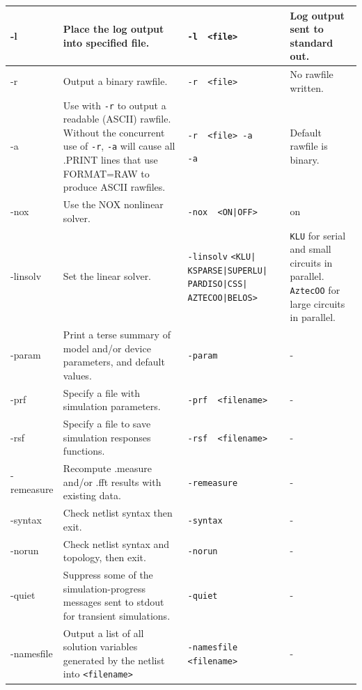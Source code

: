 \begin{longtable}[h] {>{\raggedright\small}m{1.1in}|>{\raggedright\small}m{2in}|>{\raggedright\small}m{1.5in}|>{\raggedright\let\\\tabularnewline\small}m{1in}}
-l &
Place the log output into specified file. &
\verb+-l  <file>+ &
Log output sent to standard out. \\ \hline

-r &
Output a binary rawfile. &
\verb+-r  <file>+ &
No rawfile written. \\ \hline

-a &
Use with \verb+-r+ to output a readable (ASCII) rawfile.
Without the concurrent use of \verb+-r+, \verb+-a+
will cause all .PRINT lines that use FORMAT=RAW to produce
ASCII rawfiles. &
\verb+-r  <file> -a+

\verb+-a+
&
Default rawfile is binary. \\ \hline

-nox &
Use the NOX nonlinear solver. &
\verb+-nox  <ON|OFF>+ &
on \\ \hline

-linsolv &
Set the linear solver. &
\verb+-linsolv+
\verb+<KLU|+
\verb+KSPARSE|SUPERLU|+
\verb+PARDISO|CSS|+
\verb+AZTECOO|BELOS>+ &
\texttt{KLU} for serial and small circuits in parallel. \texttt{AztecOO} for large circuits in parallel. \\ \hline

-param &
Print a terse summary of model and/or device parameters,
and default values. &
\verb+-param+ &
- \\ \hline

-prf &
Specify a file with simulation parameters. &
\verb+-prf  <filename>+ &
- \\ \hline

-rsf &
Specify a file to save simulation responses functions. &
\verb+-rsf  <filename>+ &
- \\ \hline

-remeasure &
Recompute .measure and/or .fft results with existing data. &
\verb+-remeasure+ &
- \\ \hline

-syntax &
Check netlist syntax then exit.&
\verb+-syntax+ &
- \\ \hline

-norun &
Check netlist syntax and topology, then exit. &
\verb+-norun+ &
- \\ \hline

-quiet &
Suppress some of the simulation-progress messages
sent to stdout for transient simulations. &
\verb+-quiet+ &
- \\ \hline

-namesfile &
Output a list of all solution variables generated by the netlist
into \texttt{<filename>} &
\verb+-namesfile+
\verb+<filename>+ &
- \\ \hline


\end{longtable}
